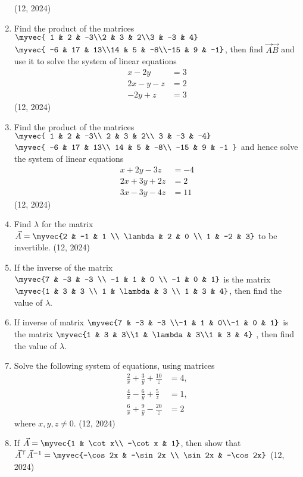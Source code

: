 \begin{enumerate}[label=\thesubsection.\arabic*,ref=\thesubsection.\theenumi]
\hfill (12, 2024)
\item Find the product of the matrices $\myvec{ 1 & 2 & -3\\2 & 3 & 2\\3 & -3 & 4}$ $\myvec{  -6 & 17 & 13\\14 & 5 & -8\\-15 & 9 & -1}$, then find $\vec{A}\vec{B}$ and use it to solve the system of linear equations 
\begin{align*} x - 2y &= 3\\2x - y - z &= 2\\-2y + z &= 3\end{align*}
\hfill (12, 2024)
%
\item Find the product of the matrices $\myvec{
    1 & 2 & -3\\
    2 & 3 & 2\\
    3 & -3 & -4}$
$\myvec{
    -6 & 17 & 13\\
    14 & 5 & -8\\
    -15 & 9 & -1
}$ and hence solve the system of linear equations
\begin{align*}
x +2y-3z&=-4\\
2x+3y+2z&=2\\
3x-3y-4z&=11
\end{align*}
%
\hfill (12, 2024)
\item Find $\lambda$ for the matrix $\vec{A} = \myvec{2 & -1 & 1 \\ \lambda & 2 & 0 \\ 1 & -2 & 3}$ to be invertible. 
\hfill (12, 2024)
     \item If the inverse of the matrix $\myvec{7 & -3 & -3 \\ -1 & 1 & 0 \\ -1 & 0 & 1}$ is the matrix $\myvec{1 & 3 & 3 \\ 1 & \lambda & 3 \\ 1 & 3 & 4}$, then find the value of $\lambda$. 
	\item If inverse of matrix $\myvec{7 & -3 & -3 \\-1 & 1 & 0\\-1 & 0 & 1}$ is the matrix $\myvec{1 & 3 & 3\\1 & \lambda & 3\\1 & 3 & 4}$ , then find the value of $\lambda$. 
	\item Solve the following system of equations, using matrices
\begin{align*}
	\frac{2}{x} + \frac{3}{y} + \frac{10}{z}  &= 4, 
		\\
		\frac{4}{x} - \frac{6}{y}  + \frac{5}{z} &=1, 
		\\
		\frac{6}{x} + \frac{9}{y} - \frac{20}{z} &= 2 
\end{align*}
where $x,y,z \neq 0$.
\hfill (12, 2024)
	\item If $\vec{A}= \myvec{1 & \cot x\\ -\cot x & 1}$, then show that $\vec{A}^{\top}\vec{A}^{-1}= \myvec{-\cos 2x & -\sin 2x \\ \sin 2x & -\cos 2x}$
\hfill (12, 2024)
																	    
\end{enumerate}
